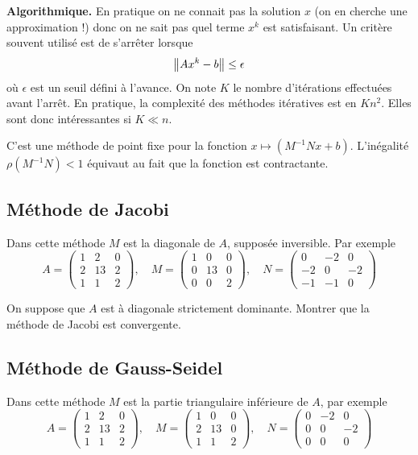 {\bf Algorithmique.}
En pratique on ne connait pas la solution $x$ (on en cherche une approximation !) donc on ne sait pas quel terme $x^k$ est satisfaisant. Un critère souvent utilisé est de s'arrêter lorsque
\[
\left\|Ax^k-b\right\| \leq \epsilon
\] 
où $\epsilon$ est un seuil défini à l'avance. On note $K$ le nombre d'itérations effectuées avant l'arrêt. En pratique, la complexité des méthodes itératives est en $Kn^2$. Elles sont donc intéressantes si $K \ll n$.

\begin{remark}
C'est une méthode de point fixe pour la fonction $x \mapsto (M^{-1}N x +b)$. L'inégalité $\rho(M^{-1}N) < 1$ équivaut au fait que la fonction est contractante.
\end{remark}


\subsection{Méthode de Jacobi}

Dans cette méthode $M$ est la diagonale de $A$, supposée inversible. Par exemple
\[
A = \left(\begin{array}{ccc}
1 & 2 & 0 \\
2 & 13 & 2 \\
 1 & 1 & 2
\end{array}\right)
, \quad M = \left(\begin{array}{ccc}
1 & 0 & 0 \\
0 & 13 & 0 \\
 0 & 0 & 2
\end{array}\right)
, \quad N = \left(\begin{array}{ccc}
0 & -2 & 0 \\
-2 & 0 & -2 \\
-1 & -1 & 0
\end{array}\right)
\]

\begin{exercice}
On suppose que $A$ est à diagonale strictement dominante. Montrer que la
méthode de Jacobi est convergente.
\end{exercice}

\subsection{Méthode de Gauss-Seidel}

Dans cette méthode $M$ est la partie triangulaire inférieure de $A$, par exemple
\[
A = \left(\begin{array}{ccc}
1 & 2 & 0 \\
2 & 13 & 2 \\
1 & 1 & 2
\end{array}\right)
, \quad M = \left(\begin{array}{ccc}
1 & 0 & 0 \\
2 & 13 & 0 \\
1 & 1 & 2
\end{array}\right)
, \quad N = \left(\begin{array}{ccc}
0 & -2 & 0 \\
0 & 0 & -2 \\
0 & 0 & 0
\end{array}\right)
\]

